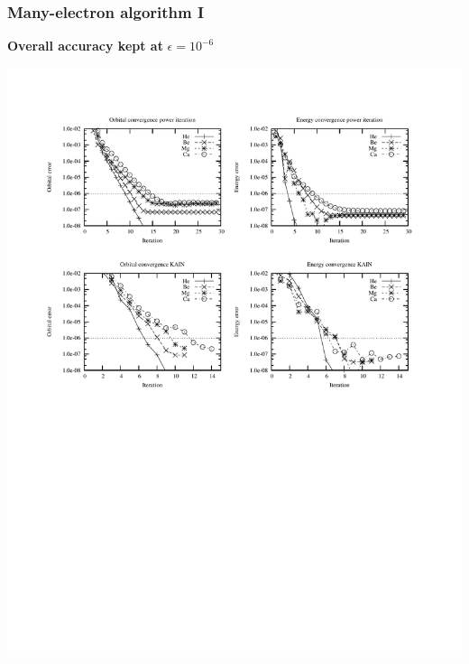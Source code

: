 \begin{frame}
    \frametitle{Many-electron algorithm I}
    \centering
    \textbf{Overall accuracy kept at} $\epsilon = 10^{-6}$
    \begin{center}
	\includegraphics[scale=1.0, clip, viewport = 50 550 300 740]{figures/accuracy.pdf}
    \end{center}
\end{frame}

